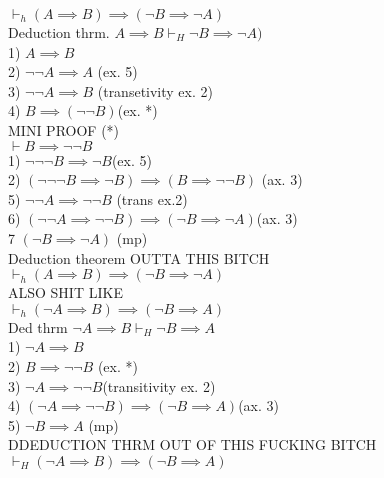 \documentclass[12pt,oneside,fleqn]{article}
\theoremstyle{definition}
\begin{document}
$\vdash_h (A \implies B) \implies (\neg B \implies \neg A)$ \\
Deduction thrm. $A \implies B \vdash_H \neg B \implies \neg A)$ \\
1) $A \implies B$ \\
2) $\neg \neg A \implies A$ (ex. 5) \\
3) $\neg \neg A \implies B$ (transetivity ex. 2) \\
4) $B \implies (\neg \neg B) $(ex. *) \\

MINI PROOF (*) \\
$\vdash B \implies \neg \neg B$ \\
1) $\neg \neg \neg B \implies \neg B $(ex. 5) \\
2) $(\neg \neg \neg B \implies \neg B) \implies (B \implies \neg \neg B)$ (ax. 3) \\

5) $\neg \neg A \implies \neg \neg B$ (trans ex.2) \\
6) $(\neg \neg A \implies \neg \neg B) \implies (\neg B \implies \neg A) $(ax. 3) \\
7 $(\neg B \implies \neg A)$ (mp) \\
Deduction theorem OUTTA THIS BITCH \\
$\vdash_h (A \implies B) \implies (\neg B \implies \neg A)$ \\

ALSO SHIT LIKE \\
$\vdash_h (\neg A \implies B) \implies (\neg B \implies A)$ \\
Ded thrm $\neg A \implies B \vdash_H \neg B \implies A$ \\
1) $\neg A \implies B$ \\
2) $B \implies \neg \neg B$ (ex. *) \\
3) $\neg A \implies \neg \neg B $(transitivity ex. 2) \\
4) $(\neg A \implies \neg \neg B ) \implies (\neg B \implies A) $(ax. 3) \\
5) $\neg B \implies A$ (mp) \\ 
DDEDUCTION THRM OUT OF THIS FUCKING BITCH \\
$\vdash_H (\neg A \implies B) \implies (\neg B \implies A)$
\end{document}
